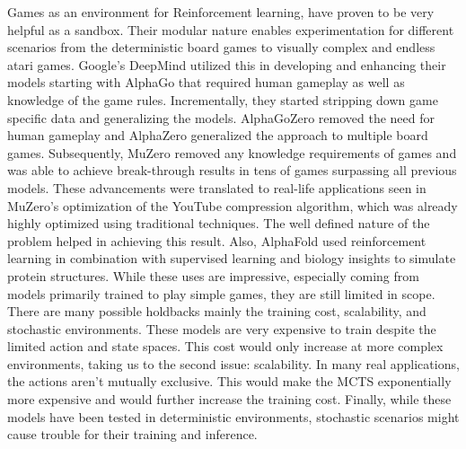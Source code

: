 Games as an environment for Reinforcement learning, have proven to be very
helpful as a sandbox. Their modular nature enables experimentation for
different scenarios from the deterministic board games to visually complex and
endless atari games. Google's DeepMind utilized this in developing and
enhancing their models starting with AlphaGo that required human gameplay as
well as knowledge of the game rules. Incrementally, they started stripping down
game specific data and generalizing the models. AlphaGoZero removed the need
for human gameplay and AlphaZero generalized the approach to multiple board
games. Subsequently, MuZero removed any knowledge requirements of games and was
able to achieve break-through results in tens of games surpassing all previous
models. These advancements were translated to real-life applications seen in
MuZero's optimization of the YouTube compression algorithm, which was already
highly optimized using traditional techniques. The well defined nature of the
problem helped in achieving this result. Also, AlphaFold used reinforcement
learning in combination with supervised learning and biology insights to
simulate protein structures. While these uses are impressive, especially
coming from models primarily trained to play simple games, they are still
limited in scope. There are many possible holdbacks mainly the training cost,
scalability, and stochastic environments. These models are very expensive to
train despite the limited action and state spaces. This cost would only
increase at more complex environments, taking us to the second issue:
scalability. In many real applications, the actions aren’t mutually exclusive.
This would make the MCTS exponentially more expensive and would further
increase the training cost. Finally, while these models have been tested in
deterministic environments, stochastic scenarios might cause trouble for their
training and inference.
